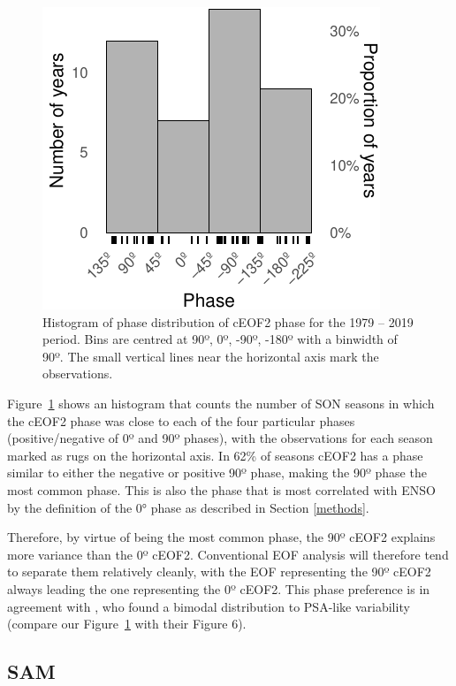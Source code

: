 \documentclass[pdflatex,lineno,sn-basic]{sn-jnl}
\theoremstyle{thmstyleone}%
\theoremstyle{thmstyletwo}%
\theoremstyle{thmstylethree}%
\begin{document}
\begin{figure}
\centering
\includegraphics{shceof_files/figure-latex/phase-histogram-1.pdf}
\caption{\label{fig:phase-histogram}Histogram of phase distribution of cEOF2 phase for the 1979 -- 2019 period. Bins are centred at 90º, 0º, -90º, -180º with a binwidth of 90º. The small vertical lines near the horizontal axis mark the observations.}
\end{figure}

Figure~\ref{fig:phase-histogram} shows an histogram that counts the number of SON seasons in which the cEOF2 phase was close to each of the four particular phases (positive/negative of 0º and 90º phases), with the observations for each season marked as rugs on the horizontal axis.
In 62\% of seasons cEOF2 has a phase similar to either the negative or positive 90º phase, making the 90º phase the most common phase.
This is also the phase that is most correlated with ENSO by the definition of the 0° phase as described in Section \ref{methods}.~

Therefore, by virtue of being the most common phase, the 90º cEOF2 explains more variance than the 0º cEOF2.
Conventional EOF analysis will therefore tend to separate them relatively cleanly, with the EOF representing the 90º cEOF2 always leading the one representing the 0º cEOF2.
This phase preference is in agreement with \citet{irving2016}, who found a bimodal distribution to PSA-like variability (compare our Figure~\ref{fig:phase-histogram} with their Figure 6).

\hypertarget{sam}{%
\subsection{SAM}\label{sam}}
\end{document}
